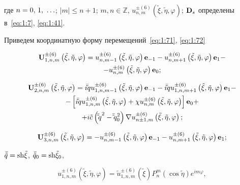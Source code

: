 \noindent где $n = 0,{\mkern 1mu} {\kern 1pt} 1,{\mkern 1mu} {\kern 1pt}  \ldots $; $|m| \le n + 1$; $m,n\in\mathbb{Z}$, $u_{n,m}^{ \pm (6)}\left( {\tilde \xi ,\tilde \eta ,\varphi } \right)$; ${{\bf{D}}_s}$ определены в~\eqref{eq:1:7}, \eqref{eq:1:41}.

Приведем координатную форму перемещений~\eqref{eq:1:71}, \eqref{eq:1:72}

\begin{multline}\label{eq:1:73}
{\bf{U}}_{1,n,m}^{ \pm (6)}\left( {\tilde \xi ,\tilde \eta ,\varphi } \right) = u_{n,m - 1}^{ \pm (6)}\left( {\tilde \xi ,\tilde \eta ,\varphi } \right){{\bf{e}}_{ - 1}} - u_{n,m + 1}^{ \pm (6)}\left( {\tilde \xi ,\tilde \eta ,\varphi } \right){{\bf{e}}_1} - \\
- u_{n,m}^{ \pm (6)}\left( {\tilde \xi ,\tilde \eta ,\varphi } \right){{\bf{e}}_0};
\end{multline}

\begin{multline}\label{eq:1:74}
{\bf{U}}_{2,n,m}^{ \pm (6)}\left( {\tilde \xi ,\tilde \eta ,\varphi } \right) = i\bar \tilde qu_{1,n,m - 1}^{ \pm (6)}\left( {\tilde \xi ,\tilde \eta ,\varphi } \right){{\bf{e}}_{ - 1}} - i\bar \tilde qu_{1,n,m + 1}^{ \pm (6)}\left( {\tilde \xi ,\tilde \eta ,\varphi } \right){{\bf{e}}_1} - \\
- \left[ {i\bar \tilde qu_{1,n,m}^{ \pm (6)}\left( {\tilde \xi ,\tilde \eta ,\varphi } \right) + \chi u_{n,m}^{ \pm (6)}\left( {\tilde \xi ,\tilde \eta ,\varphi } \right)} \right]{{\bf{e}}_0} + \\
+ i\tilde c\left( {{{\bar \tilde q}^2} - \bar \tilde q_0^2} \right)\nabla u_{n \pm 1,m}^{ \pm (6)}\left( {\tilde \xi ,\tilde \eta ,\varphi } \right);
\end{multline}

\begin{equation}\label{eq:1:75}
{\bf{U}}_{3,n,m}^{ \pm (6)}\left( {\tilde \xi ,\tilde \eta ,\varphi } \right) =  - u_{n,m - 1}^{ \pm (6)}\left( {\tilde \xi ,\tilde \eta ,\varphi } \right){{\bf{e}}_{ - 1}} - u_{n,m + 1}^{ \pm (6)}\left( {\tilde \xi ,\tilde \eta ,\varphi } \right){{\bf{e}}_1};
\end{equation}

\noindent $\bar{\tilde q} = {\mathop{\rm sh}\nolimits} \tilde\xi $, ${\bar{\tilde q}_0} = {\mathop{\rm sh}\nolimits} {\tilde \xi _0}$,

\begin{equation}\label{eq:1:76}
u_{1,n,m}^{ \pm (6)}\left( {\tilde \xi ,\tilde \eta ,\varphi } \right) = \tilde u_{1,n,m}^{ \pm (6)}(\tilde \xi )P_n^m(\cos \tilde \eta ){e^{im\varphi }},
\end{equation}

